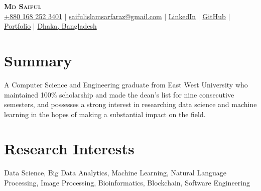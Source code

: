 \documentclass[letterpaper,11pt]{article}
\newcommand{\resumeSubHeadingListStart}{\begin{itemize}[leftmargin=0.15in, label={}]}
\newcommand{\resumeSubHeadingListEnd}{\end{itemize}}
\begin{document}


\newcommand{\iconcolor}{blue} %
\newcommand{\iconsize}{1.2em} %
\begin{center}
    \textbf{\Huge \scshape Md Saiful} \\ \vspace{3pt}
    \small
    \faMobile \hspace{.9pt} \href{tel:8801682523401}{+880 168 252 3401}
    $|$
    \faAt \hspace{.3pt} \href{mailto:saifulislamsarfaraz@gmail.com}{saifulislamsarfaraz@gmail.com}
    $|$
    \faLinkedinSquare \hspace{.3pt} \href{https://www.linkedin.com/in/md-saiful-283000181/}{LinkedIn}
    $|$
    \faGithub \hspace{.3pt} \href{https://github.com/saifulislamsarfaraz}{GitHub}
    $|$
    \faGlobe \hspace{.3pt} \href{https://saifulislamsarfaraz.github.io}{Portfolio}
    $|$
    \faMapMarker \hspace{.5pt} \href{https://goo.gl/maps/HLA1nAP5VZEeo3DV8}{Dhaka, Bangladesh}
\end{center}



\section{Summary}
  \vspace{4pt}
  \resumeSubHeadingListStart
 {A Computer Science and Engineering graduate from East West University who maintained 100\% scholarship and made the dean’s list for nine consecutive semesters, and possesses a strong interest in researching data science and machine learning in the hopes of making a substantial impact on the field.}
  \resumeSubHeadingListEnd



\section{Research Interests}
  \vspace{4pt}
  \resumeSubHeadingListStart
 {Data Science, Big Data Analytics, Machine Learning, Natural Language Processing, Image Processing, Bioinformatics, Blockchain, Software Engineering}
  \resumeSubHeadingListEnd
\end{document}
